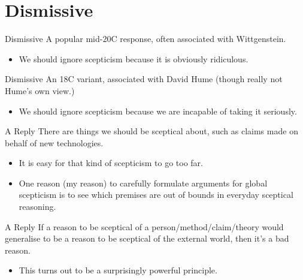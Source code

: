 \documentclass[
  17pt,
  letterpaper,
  ignorenonframetext,
  aspectratio=169,
  handout]{beamer}
\providecommand{\tightlist}{%
  \setlength{\itemsep}{0pt}\setlength{\parskip}{0pt}}\usepackage{longtable,booktabs,array}
\begin{document}
\hypertarget{dismissive}{%
\section{Dismissive}\label{dismissive}}

\begin{frame}{Dismissive}
\protect\hypertarget{dismissive-1}{}
A popular mid-20C response, often associated with Wittgenstein.

\begin{itemize}[<+->]
\tightlist
\item
  We should ignore scepticism because it is obviously ridiculous.
\end{itemize}
\end{frame}

\begin{frame}{Dismissive}
\protect\hypertarget{dismissive-2}{}
An 18C variant, associated with David Hume (though really not Hume's own
view.)

\begin{itemize}[<+->]
\tightlist
\item
  We should ignore scepticism because we are incapable of taking it
  seriously.
\end{itemize}
\end{frame}

\begin{frame}{A Reply}
\protect\hypertarget{a-reply}{}
There are things we should be sceptical about, such as claims made on
behalf of new technologies.

\begin{itemize}[<+->]
\tightlist
\item
  It is easy for that kind of scepticism to go too far.
\item
  One reason (my reason) to carefully formulate arguments for global
  scepticism is to see which premises are out of bounds in everyday
  sceptical reasoning.
\end{itemize}
\end{frame}

\begin{frame}{A Reply}
\protect\hypertarget{a-reply-1}{}
If a reason to be sceptical of a person/method/claim/theory would
generalise to be a reason to be sceptical of the external world, then
it's a bad reason.

\begin{itemize}[<+->]
\tightlist
\item
  This turns out to be a surprisingly powerful principle.
\end{itemize}
\end{frame}
\end{document}
